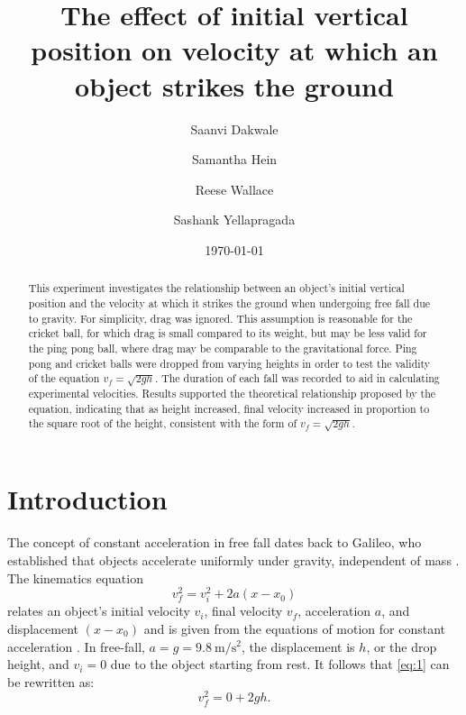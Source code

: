 \documentclass[reprint,amsmath,amssymb,aps,twoside]{revtex4-2}
\begin{document}
\setcounter{page}{35}

\title{The effect of initial vertical position on velocity at which an object strikes the ground}
\author{Saanvi Dakwale}
\author{Samantha Hein}
\author{Reese Wallace}
\author{Sashank Yellapragada}
\date{\today}

\begin{abstract}
This experiment investigates the relationship between an object’s initial vertical position and the velocity at which it strikes the ground when undergoing free fall due to gravity.  For simplicity, drag was ignored. This assumption is reasonable for the cricket ball, for which drag is small compared to its weight, but may be less valid for the ping pong ball, where drag may be comparable to the gravitational force. Ping pong and cricket balls were dropped from varying heights in order to test the validity of the equation $v_f=\sqrt{2gh}$. The duration of each fall was recorded to aid in calculating experimental velocities. Results supported the theoretical relationship proposed by the equation, indicating that as height increased, final velocity increased in proportion to the square root of the height, consistent with the form of $v_f=\sqrt{2gh}$.
\end{abstract}


\maketitle\thispagestyle{mytitlepage}

\section{Introduction}
The concept of constant acceleration in free fall dates back to Galileo, who established that objects accelerate uniformly under gravity, independent of mass \cite{galilei:1638:discorsi, machamer:2021:galileo}. The kinematics equation 
\begin{equation}
v_f^2 = v_i^2 + 2 a (x-x_0)
\label{eq:1}
\end{equation}
relates an object’s initial velocity $v_i$, final velocity $v_f$, acceleration $a$, and displacement $(x-x_0)$ and is given from the equations of motion for constant acceleration \cite{tipler, openstax, barrons, hall:2022:motion}. In free-fall, $a=g=\qty{9.8}{\meter\per\second\squared}$, the displacement is $h$, or the drop height, and $v_i=0$ due to the object starting from rest. It follows that \cref{eq:1} can be rewritten as: 
\begin{equation}
v_f^2 = 0 + 2 g h.
\end{equation}
\end{document}
